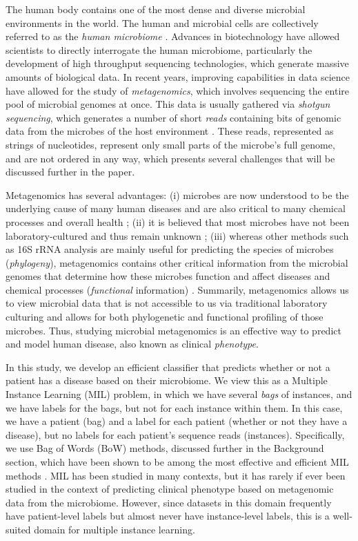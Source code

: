 
The human body contains one of the most dense and diverse microbial environments in the world. The human and microbial cells are collectively referred to as the \emph{human microbiome} \cite{turnbaugh_human_2007,backhed_host-bacterial_2005}. Advances in biotechnology have allowed scientists to directly interrogate the human microbiome, particularly the development of high throughput sequencing technologies, which generate massive amounts of biological data. In recent years, improving capabilities in data science have allowed for the study of \emph{metagenomics}, which involves sequencing the entire pool of microbial genomes at once. This data is usually gathered via \emph{shotgun sequencing}, which generates a number of short \emph{reads} containing bits of genomic data from the microbes of the host environment \cite{messing81}. These reads, represented as strings of nucleotides, represent only small parts of the microbe's full genome, and are not ordered in any way, which presents several challenges that will be discussed further in the paper. 

Metagenomics has several advantages: (i) microbes are now understood to be the underlying cause of many human diseases and are also critical to many chemical processes and overall health \cite{handelsman04}; (ii) it is believed that most microbes have not been laboratory-cultured and thus remain unknown \cite{handelsman04}; (iii) whereas other methods such as 16S rRNA analysis are mainly useful for predicting the species of microbes (\emph{phylogeny}), metagenomics contains other critical information from the microbial genomes that determine how these microbes function and affect diseases and chemical processes (\emph{functional} information) \cite{handelsman04}. Summarily, metagenomics allows us to view microbial data that is not accessible to us via traditional laboratory culturing and allows for both phylogenetic and functional profiling of those microbes. Thus, studying microbial metagenomics is an effective way to predict and model human disease, also known as clinical \emph{phenotype}.

In this study, we develop an efficient classifier that predicts whether or not a patient has a disease based on their microbiome. We view this as a Multiple Instance Learning (MIL) problem, in which we have several \emph{bags} of instances, and we have labels for the bags, but not for each instance within them. In this case, we have a patient (bag) and a label for each patient (whether or not they have a disease), but no labels for each patient's sequence reads (instances). Specifically, we use Bag of Words (BoW) methods, discussed further in the Background section, which have been shown to be among the most effective and efficient MIL methods \cite{amores13}. MIL has been studied in many contexts, but it has rarely if ever been studied in the context of predicting clinical phenotype based on metagenomic data from the microbiome. However, since datasets in this domain frequently have patient-level labels but almost never have instance-level labels, this is a well-suited domain for multiple instance learning. 

